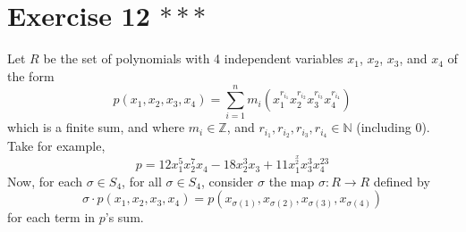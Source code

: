\documentclass{article}
\newcommand{\N}{\mathbb{N}}
\newcommand{\Z}{\mathbb{Z}}
\begin{document}
    \section*{Exercise 12 $***$}
    Let $R$ be the set of polynomials with 4 independent variables 
    $x_1$, $x_2$, $x_3$, and $x_4$ of the form
    \[ p(x_1, x_2, x_3, x_4) = \sum_{i = 1}^{n}
    m_i(x_1^{r_{i_1}}x_2^{r_{i_2}}x_3^{r_{i_3}}x_4^{r_{i_4}}) \]
    which is a finite sum,
    and where $m_i \in \Z$,
    and $r_{i_1}, r_{i_2}, r_{i_3}, r_{i_4} \in \N$ (including 0).
    Take for example,
    \[ p = 12x_1^5x_2^7x_4 - 18x_2^3x_3 + 11x_1^^x_2x_3^3x_4^{23} \]
    Now, for each $\sigma \in S_4$,
    for all $\sigma \in S_4$,
    consider $\sigma$ the map $\sigma: R \to R$ defined by \\
    \[\sigma \cdot p(x_1, x_2, x_3, x_4)
    = p(x_{\sigma(1)}, x_{\sigma(2)}, x_{\sigma(3)}, x_{\sigma(4)})\]
    for each term in $p$'s sum.
\end{document}

